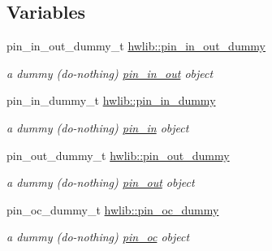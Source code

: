 \subsection*{Variables}
\begin{DoxyCompactItemize}
\item 
\mbox{\label{namespacehwlib_a31dffd2fd7fac67f296449c4fa28b12a}} 
pin\+\_\+in\+\_\+out\+\_\+dummy\+\_\+t \hyperlink{namespacehwlib_a31dffd2fd7fac67f296449c4fa28b12a}{hwlib\+::pin\+\_\+in\+\_\+out\+\_\+dummy}
\begin{DoxyCompactList}\small\item\em a dummy (do-\/nothing) \hyperlink{classhwlib_1_1pin__in__out}{pin\+\_\+in\+\_\+out} object \end{DoxyCompactList}\item 
\mbox{\label{namespacehwlib_a5525c01598961cadd66dbed9186c08fb}} 
pin\+\_\+in\+\_\+dummy\+\_\+t \hyperlink{namespacehwlib_a5525c01598961cadd66dbed9186c08fb}{hwlib\+::pin\+\_\+in\+\_\+dummy}
\begin{DoxyCompactList}\small\item\em a dummy (do-\/nothing) \hyperlink{classhwlib_1_1pin__in}{pin\+\_\+in} object \end{DoxyCompactList}\item 
\mbox{\label{namespacehwlib_a61238c70def9e482f316de1cba4401b7}} 
pin\+\_\+out\+\_\+dummy\+\_\+t \hyperlink{namespacehwlib_a61238c70def9e482f316de1cba4401b7}{hwlib\+::pin\+\_\+out\+\_\+dummy}
\begin{DoxyCompactList}\small\item\em a dummy (do-\/nothing) \hyperlink{classhwlib_1_1pin__out}{pin\+\_\+out} object \end{DoxyCompactList}\item 
\mbox{\label{namespacehwlib_a56c2e1c8df25a3fe5db02c83940acbfc}} 
pin\+\_\+oc\+\_\+dummy\+\_\+t \hyperlink{namespacehwlib_a56c2e1c8df25a3fe5db02c83940acbfc}{hwlib\+::pin\+\_\+oc\+\_\+dummy}
\begin{DoxyCompactList}\small\item\em a dummy (do-\/nothing) \hyperlink{classhwlib_1_1pin__oc}{pin\+\_\+oc} object \end{DoxyCompactList}\end{DoxyCompactItemize}
